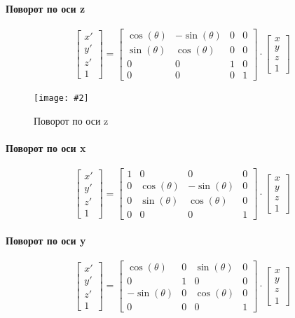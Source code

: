 \documentclass[a4paper, 14pt]{extarticle}
\newcommand{\screenshot}[3]{
	\begin{figure}[h]
		\centering
		\texttt{[image: \#2]}
		\caption{#3}
	\end{figure}
}
\begin{document}
\paragraph{Поворот по оси z}
$$
\begin{bmatrix} x' \\ y' \\ z' \\ 1 \end{bmatrix} = 
\begin{bmatrix}
\cos(\theta) & -\sin(\theta) & 0 & 0 \\
\sin(\theta) & \cos(\theta) & 0 & 0 \\
0 & 0 & 1 & 0 \\
0 & 0 & 0 & 1
\end{bmatrix}
\cdot
\begin{bmatrix} x \\ y \\ z \\ 1 \end{bmatrix}
$$
\screenshot{width=12cm}{l4/S007.jpg}{Поворот по оси z}

\paragraph{Поворот по оси x}
$$
\begin{bmatrix} x' \\ y' \\ z' \\ 1 \end{bmatrix} = 
\begin{bmatrix}
1 & 0 & 0 & 0 \\
0 & \cos(\theta) & -\sin(\theta) & 0 \\
0 & \sin(\theta) & \cos(\theta) & 0 \\
0 & 0 & 0 & 1
\end{bmatrix}
\cdot
\begin{bmatrix} x \\ y \\ z \\ 1 \end{bmatrix}
$$

\paragraph{Поворот по оси y}
$$
\begin{bmatrix} x' \\ y' \\ z' \\ 1 \end{bmatrix} = 
\begin{bmatrix}
\cos(\theta) & 0 & \sin(\theta) & 0 \\
0 & 1 & 0 & 0 \\
-\sin(\theta) & 0 & \cos(\theta) & 0 \\
0 & 0 & 0 & 1
\end{bmatrix}
\cdot
\begin{bmatrix} x \\ y \\ z \\ 1 \end{bmatrix}
$$
\end{document}
